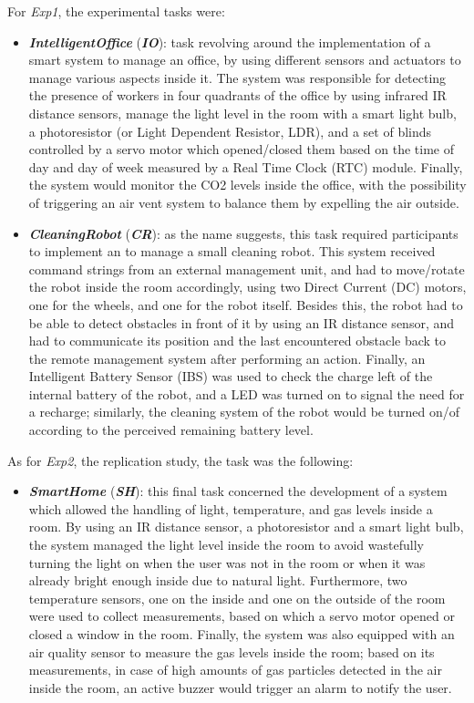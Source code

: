 For \textit{Exp1}, the experimental tasks were:
\begin{itemize}
    \item \textbf{\textit{IntelligentOffice}} (\textbf{\textit{IO}}): task revolving around the implementation of a smart system to manage an office, by using different sensors and actuators to manage various aspects inside it. The system was responsible for detecting the presence of workers in four quadrants of the office by using infrared IR distance sensors, manage the light level in the room with a smart light bulb, a photoresistor (or Light Dependent Resistor, LDR), and a set of blinds controlled by a servo motor which opened/closed them based on the time of day and day of week measured by a Real Time Clock (RTC) module. Finally, the system would monitor the CO2 levels inside the office, with the possibility of triggering an air vent system to balance them by expelling the air outside.

    \item \textbf{\textit{CleaningRobot}} (\textbf{\textit{CR}}): as the name suggests, this task required participants to implement an \es to manage a small cleaning robot. This system received command strings from an external management unit, and had to move/rotate the robot inside the room accordingly, using two Direct Current (DC) motors, one for the wheels, and one for the robot itself. Besides this, the robot had to be able to detect obstacles in front of it by using an IR distance sensor, and had to communicate its position and the last encountered obstacle back to the remote management system after performing an action. Finally, an Intelligent Battery Sensor (IBS) was used to check the charge left of the internal battery of the robot, and a LED was turned on to signal the need for a recharge; similarly, the cleaning system of the robot would be turned on/of according to the perceived remaining battery level.
\end{itemize}

As for \textit{Exp2}, the replication study, the task was the following:
\begin{itemize}
    \item \textbf{\textit{SmartHome}} (\textbf{\textit{SH}}): this final task concerned the development of a system which allowed the handling of light, temperature, and gas levels inside a room. By using an IR distance sensor, a photoresistor and a smart light bulb, the system managed the light level inside the room to avoid wastefully turning the light on when the user was not in the room or when it was already bright enough inside due to natural light. Furthermore, two temperature sensors, one on the inside and one on the outside of the room were used to collect measurements, based on which a servo motor opened or closed a window in the room. Finally, the system was also equipped with an air quality sensor to measure the gas levels inside the room; based on its measurements, in case of high amounts of gas particles detected in the air inside the room, an active buzzer would trigger an alarm to notify the user.
\end{itemize}

